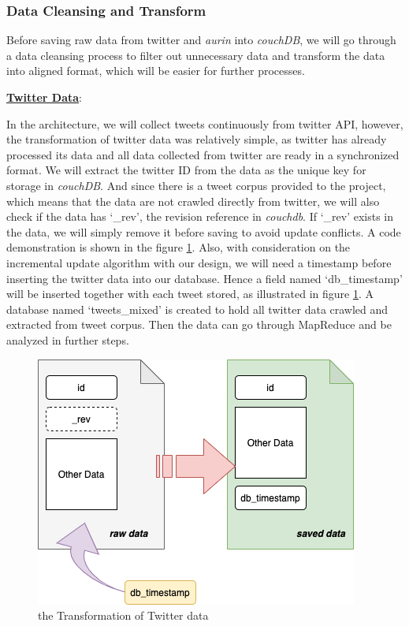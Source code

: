 \documentclass{article}
\begin{document}
\subsubsection{Data Cleansing and Transform}
Before saving raw data from twitter and \textit{aurin} into \textit{couchDB}, we will go through a data cleansing process to filter out unnecessary data and transform the data into aligned format, which will be easier for further processes. 

\textbf{\underline{Twitter Data}}: 

In the architecture, we will collect tweets continuously from twitter API, however, the transformation of twitter data was relatively simple, as twitter has already processed its data and all data collected from twitter are ready in a synchronized format. We will extract the twitter ID from the data as the unique key for storage in \textit{couchDB}. And since there is a tweet corpus provided to the project, which means that the data are not crawled directly from twitter, we will also check if the data has ‘\_rev’, the revision reference in \textit{couchdb}. If ‘\_rev’ exists in the data, we will simply remove it before saving to avoid update conflicts. A code demonstration is shown in the figure \ref{fig:twitterdata}.
Also, with consideration on the incremental update algorithm with our design, we will need a timestamp before inserting the twitter data into our database. Hence a field named ‘db\_timestamp’ will be inserted together with each tweet stored, as illustrated in figure \ref{fig:twitterdata}. A database named ‘tweets\_mixed’ is created to hold all twitter data crawled and extracted from tweet corpus. Then the data can go through MapReduce and be analyzed in further steps.
\begin{figure}
\centering
\includegraphics{img/twitterdata.png}
\caption{the Transformation of Twitter data}
\label{fig:twitterdata}
\end{figure}
\end{document}
